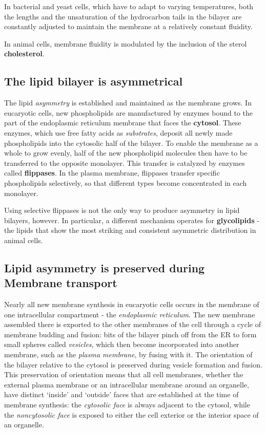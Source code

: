 In bacterial and yeast cells, which have to adapt to varying temperatures,
both the lengths and the unsaturation of the hydrocarbon tails in the
bilayer are constantly adjusted to maintain the membrane at a relatively
constant fluidity.

In animal cells, membrane fluidity is modulated by the inclusion of the
sterol \textbf{cholesterol}.

\subsection{The lipid bilayer is asymmetrical}

The lipid \textit{asymmetry} is established and maintained as the membrane
grows. In eucaryotic cells, new phospholipids are manufactured by
enzymes bound to the part of the endoplasmic reticulum membrane that
faces the \textbf{cytosol}. These enzymes, which use free fatty acids as \textit{substrates},
deposit all newly made phospholipids into the
cytosolic half of the bilayer. To enable the membrane as a whole to grow
evenly, half of the new phospholipid molecules then have to be transferred
to the opposite monolayer. This transfer is catalyzed by enzymes
called \textbf{flippases}. In the plasma membrane, flippases transfer
specific phospholipids selectively, so that different types become concentrated
in each monolayer.

Using selective flippases is not the only way to produce asymmetry in
lipid bilayers, however. In particular, a different mechanism operates for
\textbf{glycolipids} - the lipids that show the most striking and consistent asymmetric
distribution in animal cells.

\subsection{Lipid asymmetry is preserved during Membrane transport}

Nearly all new membrane synthesis in eucaryotic cells occurs in the
membrane of one intracellular compartment - the \textit{endoplasmic reticulum}.
The new membrane assembled there is exported
to the other membranes of the cell through a cycle of membrane budding
and fusion: bits of the bilayer pinch off from the ER to form small spheres
called \textit{vesicles}, which then become incorporated into another membrane,
such as the \textit{plasma membrane}, by fusing with it. The orientation
of the bilayer relative to the cytosol is preserved during vesicle
formation and fusion. This preservation of orientation means that all cell
membranes, whether the external plasma membrane or an intracellular
membrane around an organelle, have distinct ‘inside’ and ‘outside’ faces
that are established at the time of membrane synthesis: the \textit{cytosolic face}
is always adjacent to the cytosol, while the \textit{noncytosolic face} is exposed
to either the cell exterior or the interior space of an organelle.

